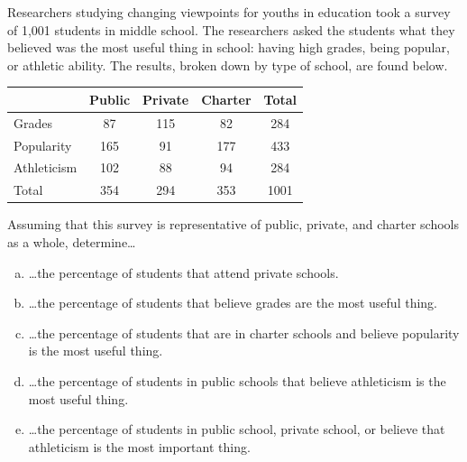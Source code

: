 \documentclass[12pt,letterpaper]{exam}
\begin{document}
\examtitle
{} 
\scores
\bottomline
\newpage

\begin{questions}

\newpage
\question[15] Researchers studying changing viewpoints for youths in education took a survey of 1,001 students in middle school. The researchers asked the students what they believed was the most useful thing in school: having high grades, being popular, or athletic ability. The results, broken down by type of school, are found below. \par
	\begin{table}[!ht]
	\centering
	\begin{tabular}{| l || c | c | c || c |} \hline 
	& Public & Private & Charter & Total \\ \hline \hline
	Grades & 87 & 115 & 82 & 284 \\ \hline
	Popularity & 165 & 91 & 177 & 433 \\ \hline
	Athleticism & 102 & 88 & 94 & 284 \\ \hline \hline
	Total & 354 & 294 & 353 & 1001 \\ \hline
	\end{tabular}
	\end{table} \par
Assuming that this survey is representative of public, private, and charter schools as a whole, determine\dots

\begin{enumerate}[(a)]
\item \dots the percentage of students that attend private schools. 
\item \dots the percentage of students that believe grades are the most useful thing. 
\item \dots the percentage of students that are in charter schools and believe popularity is the most useful thing. 
\item \dots the percentage of students in public schools that believe athleticism is the most useful thing. 
\item \dots the percentage of students in public school, private school, or believe that athleticism is the most important thing. 
\end{enumerate} \pspace


\end{questions}
\end{document}
